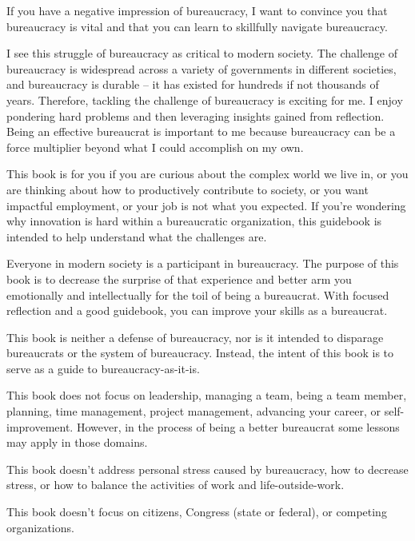 

If you have a negative impression of bureaucracy, I want to convince you that bureaucracy is vital and that you can learn to skillfully navigate bureaucracy.

I see this struggle of bureaucracy as critical to modern society. The challenge of bureaucracy is widespread across a variety of governments in different societies, and bureaucracy is durable -- it has existed for hundreds if not thousands of years. Therefore, tackling the challenge of bureaucracy is exciting for me. I enjoy pondering hard problems and then leveraging insights gained from reflection. Being an effective bureaucrat is important to me because bureaucracy can be a force multiplier beyond what I could accomplish on my own.

This book is for you if you are curious about the complex world we live in, or you are thinking about how to productively contribute to society, or you want impactful employment, or your job is not what you expected. If you're wondering why innovation is hard within a bureaucratic organization, this guidebook is intended to help understand what the challenges are.


Everyone in modern society is a participant in bureaucracy. The purpose of this book is to decrease the surprise of that experience and better arm you emotionally and intellectually for the toil of being a bureaucrat. With focused reflection and a good guidebook, you can improve your skills as a bureaucrat. 

This book is neither a defense of bureaucracy, nor is it intended to disparage bureaucrats or the system of bureaucracy. Instead, the intent of this book is to serve as a guide to bureaucracy-as-it-is. 

This book does not focus on leadership, managing a team, being a team member, planning, time management, project management, advancing your career, or self-improvement. However, in the process of being a better bureaucrat some lessons may apply in those domains.

This book doesn't address personal stress caused by bureaucracy, how to decrease stress, or how to balance the activities of work and life-outside-work. 

This book doesn't focus on citizens, Congress (state or federal), or competing organizations. 

